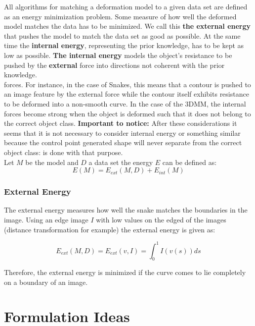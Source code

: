 \documentclass{article}
\begin{document}
   All algorithms for matching a deformation model to a given data set are defined as an energy minimization problem. Some
measure of how well the deformed model matches the data has to be minimized. We call this \textbf{the external energy} that pushes
the model to match the data set as good as possible. At the same time the \textbf{internal energy}, representing the prior knowledge,
has to be kept as low as possible. \textbf{The internal energy} models the object’s resistance to be pushed by the \textbf{external} force into
directions not coherent with the prior knowledge. \\

forces. For instance, in the case of Snakes, this means that a contour is pushed to an image feature by the external force while
the contour itself exhibits resistance to be deformed into a non-smooth curve. In the case of the 3DMM, the internal forces
become strong when the object is deformed such that it does not belong to the correct object class. 
\textbf{Important to notice: } After these considerations it seems that it is
not necessary to consider internal energy or something similar because the
control point generated shape will never separate from the correct object
class: is done with that purpose.\\

Let $M$ be the model and $D$ a data set the energy $E$ can be 
defined as:
$$E(M) = E_{ext}(M,D) + E_{int}(M)$$

\subsubsection*{External Energy}
The external energy measures how well the snake matches the 
boundaries in the image. Using an edge image $I$ with low
values on the edged of the images (distance transformation 
for example) the external energy is given as:

$$E_{ext}(M,D) = E_{ext}(v,I) = \int_0^1 I(v(s))ds$$

                                                                   Therefore, the external energy is minimized if the curve 
comes to lie completely on a boundary of an image.

\section{Formulation Ideas}
\end{document}
